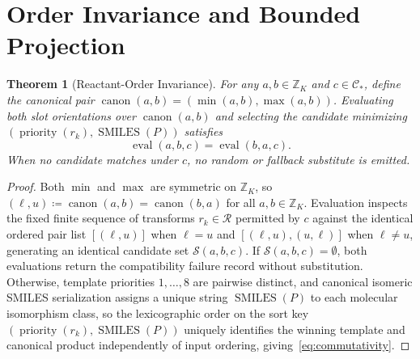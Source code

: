 \documentclass[11pt,a4paper]{article}
\theoremstyle{plain}
\newtheorem{theorem}{Theorem}[section]
\theoremstyle{definition}
\theoremstyle{remark}
\newcommand{\Z}{\mathbb{Z}}
\newcommand{\Reacts}{\mathcal{R}}
\newcommand{\Conds}{\mathcal{C}}
\begin{document}
\section{Order Invariance and Bounded Projection}\label{sec:projection}

\begin{theorem}[Reactant-Order Invariance]\label{thm:commutativity}
  For any \( a, b \in \Z_K \) and \( c \in \Conds_* \), define the canonical pair
  \( \operatorname{canon}(a, b) = (\min(a, b), \max(a, b)) \). Evaluating both slot
  orientations over \( \operatorname{canon}(a, b) \) and selecting the candidate minimizing
  \( (\operatorname{priority}(r_k), \operatorname{SMILES}(P)) \) satisfies
  \begin{equation}\label{eq:commutativity}
    \operatorname{eval}(a, b, c) = \operatorname{eval}(b, a, c).
  \end{equation}
  When no candidate matches under \( c \), no random or fallback substitute is emitted.
\end{theorem}
\begin{proof}
  Both \( \min \) and \( \max \) are symmetric on \( \Z_K \), so
  \( (\ell, u) \coloneqq \operatorname{canon}(a, b) = \operatorname{canon}(b, a) \) for all
  \( a, b \in \Z_K \). Evaluation inspects the fixed finite sequence of transforms
  \( r_k \in \Reacts \) permitted by \( c \) against the identical ordered pair list
  \( [(\ell, u)] \) when \( \ell = u \) and \( [(\ell, u), (u, \ell)] \) when
  \( \ell \neq u \), generating an identical candidate set \( \mathcal{S}(a, b, c) \). If
  \( \mathcal{S}(a, b, c) = \emptyset \), both evaluations return the compatibility failure record
  without substitution. Otherwise, template priorities \( 1, \dots, 8 \) are pairwise distinct, and
  canonical isomeric SMILES serialization assigns a unique string \( \operatorname{SMILES}(P) \)
  to each molecular isomorphism class, so the lexicographic order on the sort key
  \( (\operatorname{priority}(r_k), \operatorname{SMILES}(P)) \) uniquely identifies the winning
  template and canonical product independently of input ordering, giving~\eqref{eq:commutativity}.
\end{proof}
\end{document}
